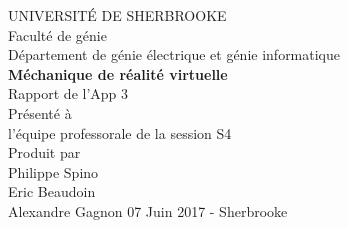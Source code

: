 \documentclass{article}
\begin{document}
\begin{titlepage}   
	\large{
		\begin{center}
			UNIVERSITÉ DE SHERBROOKE\\Faculté de génie\\
			Département de génie électrique et génie informatique\\
			\vspace{3cm}
			{\LARGE\textbf{Méchanique de réalité virtuelle}}\\
			\vspace{2cm}
			\LARGE{Rapport de l'App 3}\\
			\vspace{2cm}
			Présenté à\\l'équipe professorale de la session S4\\
			\vspace{2cm}
			Produit par\\Philippe Spino\\ Eric Beaudoin \\ Alexandre Gagnon
			\vspace{1cm}
			\vfill{07 Juin 2017 - Sherbrooke}
		\end{center}
	}
\end{titlepage}
\end{document}
